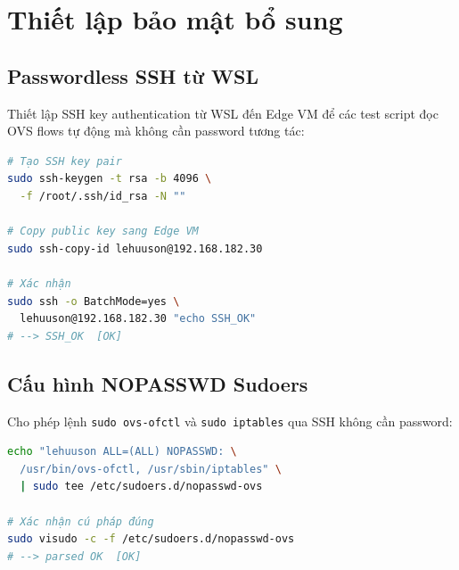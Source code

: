 \section{Thiết lập bảo mật bổ sung}

\subsection{Passwordless SSH từ WSL}

Thiết lập SSH key authentication từ WSL đến Edge VM để các test script đọc OVS flows tự động mà không cần password tương tác:

\begin{lstlisting}[language=bash, caption={Cấu hình SSH key authentication}]
# Tạo SSH key pair
sudo ssh-keygen -t rsa -b 4096 \
  -f /root/.ssh/id_rsa -N ""

# Copy public key sang Edge VM
sudo ssh-copy-id lehuuson@192.168.182.30

# Xác nhận
sudo ssh -o BatchMode=yes \
  lehuuson@192.168.182.30 "echo SSH_OK"
# --> SSH_OK  [OK]
\end{lstlisting}

\subsection{Cấu hình NOPASSWD Sudoers}

Cho phép lệnh \texttt{sudo ovs-ofctl} và \texttt{sudo iptables} qua SSH không cần password:

\begin{lstlisting}[language=bash, caption={Cấu hình sudoers cho OVS commands}]
echo "lehuuson ALL=(ALL) NOPASSWD: \
  /usr/bin/ovs-ofctl, /usr/sbin/iptables" \
  | sudo tee /etc/sudoers.d/nopasswd-ovs

# Xác nhận cú pháp đúng
sudo visudo -c -f /etc/sudoers.d/nopasswd-ovs
# --> parsed OK  [OK]
\end{lstlisting}
